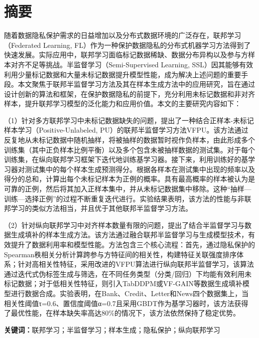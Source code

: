 


\chapter{摘\quad 要}
\xiaosi

随着数据隐私保护需求的日益增加以及分布式数据环境的广泛存在，联邦学习（Federated Learning, FL）作为一种保护数据隐私的分布式机器学习方法得到了快速发展。实际应用中，联邦学习面临标记数据稀缺、数据分布异构以及参与方样本对齐不足等挑战。半监督学习（Semi-Supervised Learning, SSL）因其能够有效利用少量标记数据和大量未标记数据提升模型性能，成为解决上述问题的重要手段。本文聚焦于联邦半监督学习方法及其在样本生成方法中的应用研究，旨在通过设计创新的算法和框架，在保护数据隐私的前提下，充分利用未标记数据和非对齐样本，提升联邦学习模型的泛化能力和应用价值。本文的主要研究内容如下：  

（1）针对多方联邦学习中未标记数据缺失的问题，提出了一种结合正样本-未标记样本学习（Positive-Unlabeled, PU）的联邦半监督学习方法VFPU。该方法通过反复地从未标记数据中随机抽样，将被抽样的数据暂时视作负样本，由此形成多个训练集（其中正负样本比例平衡）以及多个包含未被抽样数据的测试集。对于每个训练集，在纵向联邦学习框架下迭代地训练基学习器。接下来，利用训练好的基学习器对测试集中的每个样本生成预测得分。根据各样本在测试集中出现的频率以及得分的总和，计算出每个未标记样本为正例的概率。具有最高概率的样本被认为是可靠的正例，然后将其加入正样本集中，并从未标记数据集中移除。这种“抽样—训练—选择正例”的过程不断重复迭代进行。实验结果表明，该方法的性能与非联邦学习的类似方法相当，并且优于其他联邦半监督学习方法。

（2）针对纵向联邦学习中对齐样本数量有限的问题，提出了结合半监督学习与数据生成填补的样本生成方法。该方法通过融合联邦半监督学习与生成模型技术，有效提升了数据利用率和模型性能。方法包含三个核心流程：首先，通过隐私保护的Spearman秩相关分析计算跨参与方特征间的相关性，构建特征关联强度排序体系；针对高相关性特征，采用改进的VFPU算法进行纵向联邦半监督学习，该算法通过迭代式伪标签生成与筛选，在不同任务类型（分类/回归）下均能有效利用未标记数据；对于低相关性特征，则引入TabDDPM或VF-GAIN等数据生成填补模型进行数据合成。实验表明，在Bank、Credit、Letter和News四个数据集上，当相关性阈值τ=0.6、置信度阈值α=0.7且采用GBDT作为基学习器时，该方法获得了最优性能，在样本缺失率高达80\%的情况下，该方法依然保持了稳定优势。
  
\noindent\songti\textbf{关键词：}联邦学习；半监督学习；样本生成；隐私保护；纵向联邦学习

\clearpage